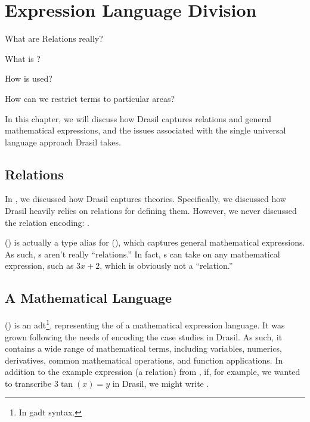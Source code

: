 \chapter{Expression Language Division}
\label{chap:lang-division}

\begin{writingdirectives}
    \item What are Relations really?
    \item What is \Expr{}?
    \item How is \Expr{} used?
    \item How can we restrict \Expr{} terms to particular areas?
\end{writingdirectives}

In this chapter, we will discuss how Drasil captures relations and general
mathematical expressions, and the issues associated with the single universal
language approach Drasil takes.

\section{Relations}
\label{chap:lang-division:sec:relations}

In , we discussed how Drasil captures theories.
Specifically, we discussed how Drasil heavily relies on relations for defining
them. However, we never discussed the relation encoding: \Relation{}.

\originalRelation{}

\Relation{} () is actually a type alias for \Expr{}
(), which captures general mathematical expressions. As
such, \Relation{}s aren't really ``relations.'' In fact, \Relation{}s can take
on any mathematical expression, such as \(3x+2\), which is obviously not a
``relation.''

\originalExprHaskell{}

\section{A Mathematical Language}
\label{chap:lang-division:sec:a-mathematical-language}

\Expr{} () is an \acs{adt}\footnote{In \acs{gadt}
syntax.}, representing the  of a mathematical expression language. It
was grown following the needs of encoding the case studies in Drasil. As such,
it contains a wide range of mathematical terms, including variables, numerics,
derivatives, common mathematical operations, and function applications. In
addition to the example expression (a relation) from
, if, for example, we wanted to transcribe
\(3 \tan{}(x) = y\) in Drasil, we might write .

